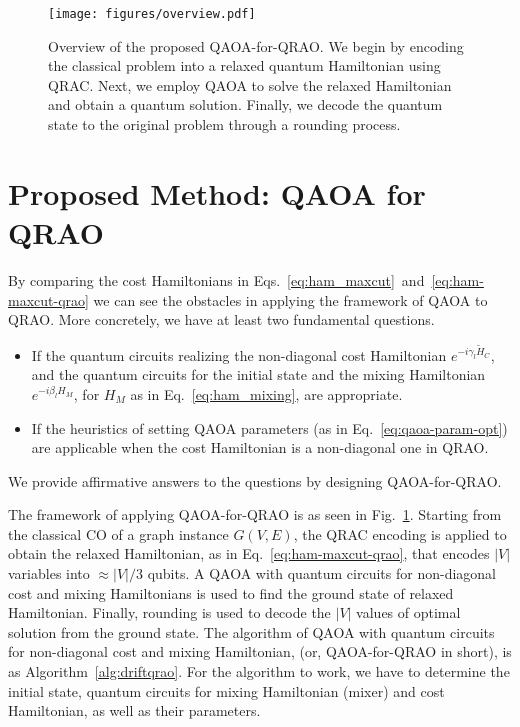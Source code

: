 \documentclass[conference,10pt]{IEEEtran}
\newcommand{\QAOAQRAO}{QAOA-for-QRAO}
\begin{document}
\begin{figure}[t]
    \centering
    \texttt{[image: figures/overview.pdf]}
    \caption{Overview of the proposed \QAOAQRAO{}. We begin by encoding the classical problem into a relaxed quantum Hamiltonian using QRAC. Next, we employ QAOA to solve the relaxed Hamiltonian and obtain a quantum solution. Finally, we decode the quantum state to the original problem through a rounding process.} 
    \label{fig:overview}
\end{figure}
\section{Proposed Method: QAOA for QRAO}
By comparing the cost Hamiltonians in Eqs.~\eqref{eq:ham_maxcut}~and~\eqref{eq:ham-maxcut-qrao} we can see the obstacles in applying the framework of QAOA to QRAO. More concretely, we have at least two fundamental questions.
\begin{itemize}
    \item If the quantum circuits realizing the non-diagonal cost Hamiltonian $e^{-i\gamma_l \tilde{H}_C}$, and the quantum circuits for the initial state and the mixing Hamiltonian $e^{-i\beta_l H_M}$, for $H_M$ as in Eq.~\eqref{eq:ham_mixing}, are appropriate.
    \item If the heuristics of setting QAOA parameters (as in Eq.~\eqref{eq:qaoa-param-opt}) are applicable when the cost Hamiltonian is a non-diagonal one in QRAO. %
\end{itemize}
We provide affirmative answers to the questions by designing \QAOAQRAO{}. %

The framework of applying \QAOAQRAO{} is as seen in Fig.~\ref{fig:overview}. 
Starting from the classical CO of a graph instance $G(V,E)$, the QRAC encoding is applied to obtain the relaxed Hamiltonian, as in Eq.~\eqref{eq:ham-maxcut-qrao}, that encodes $|V|$ variables into $\approx |V|/3$ qubits. A QAOA with quantum circuits for non-diagonal cost and mixing Hamiltonians is used to find the ground state of relaxed Hamiltonian. Finally, rounding is used to decode the $|V|$ values of optimal solution from the ground state. The algorithm of QAOA with quantum circuits for non-diagonal cost and mixing Hamiltonian, (or, \QAOAQRAO{} in short), is as Algorithm~\ref{alg:driftqrao}. For the algorithm to work, we have to determine the initial state, quantum circuits for mixing Hamiltonian (mixer) and cost Hamiltonian, as well as their parameters.  
\end{document}
